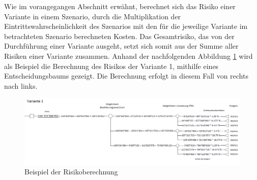 %
%
%
%

\label{subsec:BerechnungRisiken}


Wie im vorangegangen Abschnitt erwähnt, berechnet sich das Risiko einer Variante in einem Szenario, durch die Multiplikation der Eintrittswahrscheinlichkeit des Szenarios mit den für die jeweilige Variante im betrachteten Szenario berechneten Kosten. Das Gesamtrisiko, das von der Durchführung einer Variante ausgeht, setzt sich somit aus der Summe aller Risiken einer Variante zusammen. 
Anhand der nachfolgenden Abbildung \ref{img:Risikoberechnung1} wird als Beispiel die Berechnung des Risikos der Variante 1, mithilfe eines Entscheidungsbaums gezeigt. Die Berechnung erfolgt in diesem Fall von rechts nach links.


\begin{figure}[h!]
	\centering
	\includegraphics[width=\textwidth]{figures/f-04-08-01-Risikoberechnung}
	\caption[Risikoberechnung]{Beispiel der Risikoberechnung}
	\label{img:Risikoberechnung1}
\end{figure}




%

